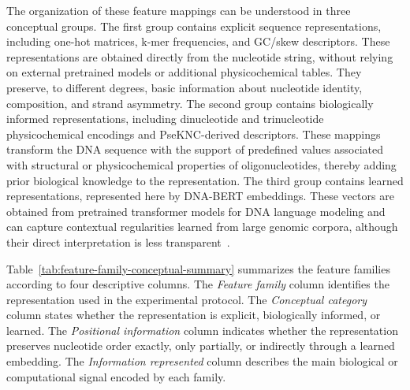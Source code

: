 The organization of these feature mappings can be understood in three conceptual groups. The first group contains explicit sequence representations, including one-hot matrices, k-mer frequencies, and GC/skew descriptors. These representations are obtained directly from the nucleotide string, without relying on external pretrained models or additional physicochemical tables. They preserve, to different degrees, basic information about nucleotide identity, composition, and strand asymmetry. The second group contains biologically informed representations, including dinucleotide and trinucleotide physicochemical encodings and PseKNC-derived descriptors. These mappings transform the DNA sequence with the support of predefined values associated with structural or physicochemical properties of oligonucleotides, thereby adding prior biological knowledge to the representation. The third group contains learned representations, represented here by DNA-BERT embeddings. These vectors are obtained from pretrained transformer models for DNA language modeling and can capture contextual regularities learned from large genomic corpora, although their direct interpretation is less transparent~\citep{goodfellow2016deep,umarov2017recognition,moraes2022capsprom,leslie2002spectrum,lobry1996asymmetric,moraes2023physicochemical,chen2014pseknc,chen2015psekncgeneral,ji2021dnabert}.

Table~\ref{tab:feature-family-conceptual-summary} summarizes the feature families according to four descriptive columns. The \emph{Feature family} column identifies the representation used in the experimental protocol. The \emph{Conceptual category} column states whether the representation is explicit, biologically informed, or learned. The \emph{Positional information} column indicates whether the representation preserves nucleotide order exactly, only partially, or indirectly through a learned embedding. The \emph{Information represented} column describes the main biological or computational signal encoded by each family.

